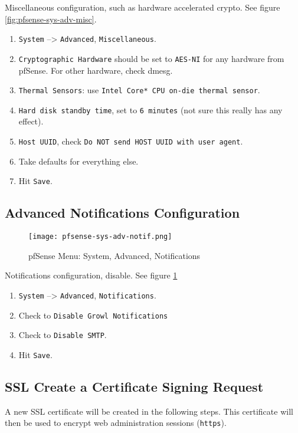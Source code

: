 Miscellaneous configuration, such as hardware accelerated crypto.
See figure \ref{fig:pfsense-sys-adv-misc}.

\begin{enumerate}
 \item \texttt{System} --> \texttt{Advanced}, \texttt{Miscellaneous}.
 \item \texttt{Cryptographic Hardware} should be set to \texttt{AES-NI} for any hardware from pfSense. For other hardware, check dmesg.
 \item \texttt{Thermal Sensors}: use \texttt{Intel Core* CPU on-die thermal sensor}.
 \item \texttt{Hard disk standby time}, set to \texttt{6 minutes} (not sure this really has any effect).
 \item \texttt{Host UUID}, check \texttt{Do NOT send HOST UUID with user agent}.
 \item Take defaults for everything else.
 \item Hit \texttt{Save}.
\end{enumerate}

\subsection{Advanced Notifications Configuration}
\begin{figure}[h!]
\begin{center}
\texttt{[image: pfsense-sys-adv-notif.png]}
 \caption{pfSense Menu: System, Advanced, Notifications}
 \label{fig:pfsense-sys-adv-notif.png}
\end{center}
\end{figure}

Notifications configuration, disable.
See figure \ref{fig:pfsense-sys-adv-notif.png}

\begin{enumerate}
 \item \texttt{System} --> \texttt{Advanced}, \texttt{Notifications}.
 \item Check to \texttt{Disable Growl Notifications}
 \item Check to \texttt{Disable SMTP}.
 \item Hit \texttt{Save}.
\end{enumerate}

\subsection{SSL Create a Certificate Signing Request}
A new SSL certificate will be created in the following steps. This certificate will then be used to
encrypt web administration sessions (\texttt{https}).

